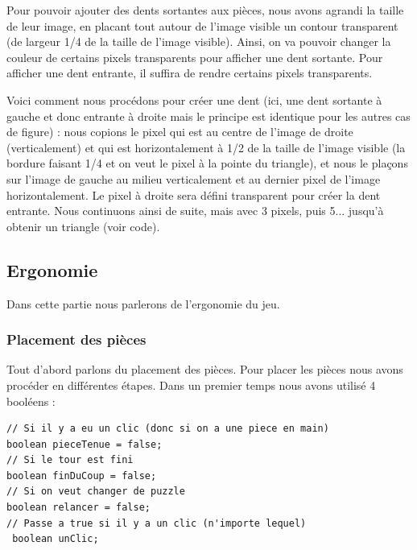 \documentclass[]{article}
\begin{document}
Pour pouvoir ajouter des dents sortantes aux pièces, nous avons agrandi la taille de leur image, en placant tout autour de l'image visible un contour transparent (de largeur 1/4 de la taille de l'image visible). Ainsi, on va pouvoir changer la couleur de certains pixels transparents pour afficher une dent sortante. Pour afficher une dent entrante, il suffira de rendre certains pixels transparents.

Voici comment nous procédons pour créer une dent (ici, une dent sortante à gauche et donc entrante à droite mais le principe est identique pour les autres cas de figure) : nous copions le pixel qui est au centre de l'image de droite (verticalement) et qui est horizontalement à 1/2 de la taille de l'image visible (la bordure faisant 1/4 et on veut le pixel à la pointe du triangle), et nous le plaçons sur l'image de gauche au milieu verticalement et au dernier pixel de l'image horizontalement. Le pixel à droite sera défini transparent pour créer la dent entrante. Nous continuons ainsi de suite, mais avec 3 pixels, puis 5... jusqu'à obtenir un triangle (voir code).


\newpage
\subsection{Ergonomie}

Dans cette partie nous parlerons de l'ergonomie du jeu.
\subsubsection{Placement des pièces}
Tout d'abord parlons du placement des pièces.
Pour placer les pièces nous avons procéder en différentes étapes. Dans un premier temps nous avons utilisé 4 booléens : 
\begin{lstlisting}
// Si il y a eu un clic (donc si on a une piece en main)
boolean pieceTenue = false;
// Si le tour est fini
boolean finDuCoup = false;
// Si on veut changer de puzzle
boolean relancer = false;
// Passe a true si il y a un clic (n'importe lequel)
 boolean unClic;
\end{lstlisting}
\end{document}
